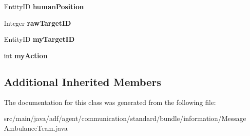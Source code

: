\begin{DoxyCompactItemize}
Entity\+ID {\bfseries human\+Position}
\item 
\hypertarget{classadf_1_1agent_1_1communication_1_1standard_1_1bundle_1_1information_1_1MessageAmbulanceTeam_a66576eca6b7fafc7ec850366c2fc2185}{}\label{classadf_1_1agent_1_1communication_1_1standard_1_1bundle_1_1information_1_1MessageAmbulanceTeam_a66576eca6b7fafc7ec850366c2fc2185} 
Integer {\bfseries raw\+Target\+ID}
\item 
\hypertarget{classadf_1_1agent_1_1communication_1_1standard_1_1bundle_1_1information_1_1MessageAmbulanceTeam_a0f31713568c915648039f781ddb94343}{}\label{classadf_1_1agent_1_1communication_1_1standard_1_1bundle_1_1information_1_1MessageAmbulanceTeam_a0f31713568c915648039f781ddb94343} 
Entity\+ID {\bfseries my\+Target\+ID}
\item 
\hypertarget{classadf_1_1agent_1_1communication_1_1standard_1_1bundle_1_1information_1_1MessageAmbulanceTeam_afe46a1c45673803c06f42b623f081366}{}\label{classadf_1_1agent_1_1communication_1_1standard_1_1bundle_1_1information_1_1MessageAmbulanceTeam_afe46a1c45673803c06f42b623f081366} 
int {\bfseries my\+Action}
\end{DoxyCompactItemize}
\subsection*{Additional Inherited Members}


The documentation for this class was generated from the following file\+:\begin{DoxyCompactItemize}
\item 
src/main/java/adf/agent/communication/standard/bundle/information/Message\+Ambulance\+Team.\+java\end{DoxyCompactItemize}
